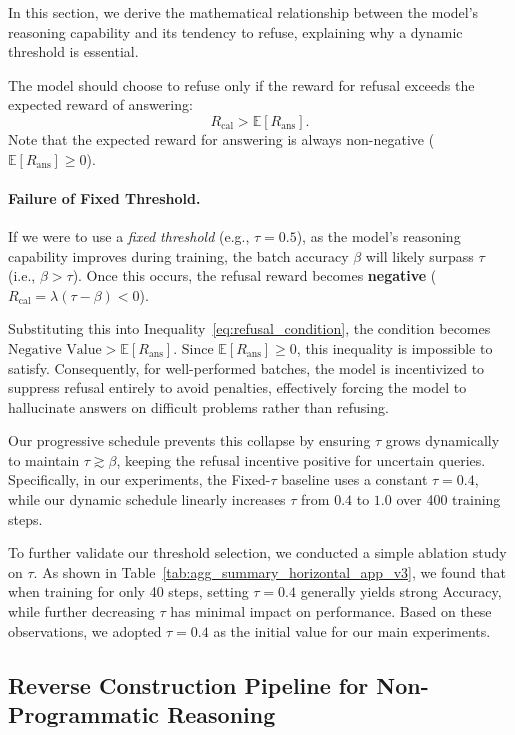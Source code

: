 In this section, we derive the mathematical relationship between the model's reasoning capability and its tendency to refuse, explaining why a dynamic threshold is essential.

The model should choose to refuse only if the reward for refusal exceeds the expected reward of answering:
\begin{equation}
    R_{\text{cal}} > \mathbb{E}[R_{\text{ans}}].
    \label{eq:refusal_condition}
\end{equation}
Note that the expected reward for answering is always non-negative ($\mathbb{E}[R_{\text{ans}}] \ge 0$). 

\paragraph{Failure of Fixed Threshold.} If we were to use a \textit{fixed threshold} (e.g., $\tau=0.5$), as the model's reasoning capability improves during training, the batch accuracy $\beta$ will likely surpass $\tau$ (i.e., $\beta > \tau$). Once this occurs, the refusal reward becomes \textbf{negative} ($R_{\text{cal}} = \lambda(\tau - \beta) < 0$). 

Substituting this into Inequality~\ref{eq:refusal_condition}, the condition becomes $ \text{Negative Value} > \mathbb{E}[R_{\text{ans}}]$. Since $\mathbb{E}[R_{\text{ans}}] \ge 0$, this inequality is impossible to satisfy. Consequently, for well-performed batches, the model is incentivized to suppress refusal entirely to avoid penalties, effectively forcing the model to hallucinate answers on difficult problems rather than refusing. 

Our progressive schedule prevents this collapse by ensuring $\tau$ grows dynamically to maintain $\tau \gtrsim \beta$, keeping the refusal incentive positive for uncertain queries. Specifically, in our experiments, the Fixed-$\tau$ baseline uses a constant $\tau = 0.4$, while our dynamic schedule linearly increases $\tau$ from $0.4$ to $1.0$ over 400 training steps.

To further validate our threshold selection, we conducted a simple ablation study on $\tau$. As shown in Table~\ref{tab:agg_summary_horizontal_app_v3}, we found that when training for only 40 steps, setting $\tau=0.4$ generally yields strong Accuracy, while further decreasing $\tau$ has minimal impact on performance. Based on these observations, we adopted $\tau=0.4$ as the initial value for our main experiments.

\subsection{Reverse Construction Pipeline for Non-Programmatic Reasoning}
\label{subsec:reverse_pipeline}

